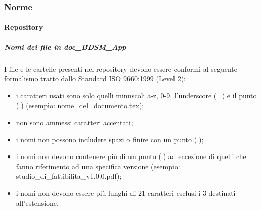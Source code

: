 		\subsubsection{Norme}
			\paragraph{Repository}
				\subparagraph{Nomi dei file in doc\_BDSM\_App}
				I file e le cartelle presenti nel repository devono essere conformi al seguente formalismo tratto dallo Standard ISO 9660:1999 (Level 2):
					\begin{itemize}
						\item i caratteri usati sono solo quelli minuscoli a-z, 0-9, l'underscore (\_) e il punto (.) (esempio: nome\_del\_documento.tex);
						\item non sono ammessi caratteri accentati;
						\item i nomi non possono includere spazi o finire con un punto (.);
						\item i nomi non devono contenere più di un punto (.) ad eccezione di quelli che fanno riferimento ad una specifica versione (esempio: studio\_di\_fattibilita\_v1.0.0.pdf);
						\item i nomi non devono essere più lunghi di 21 caratteri esclusi i 3 destinati all'estensione.
					\end{itemize}

